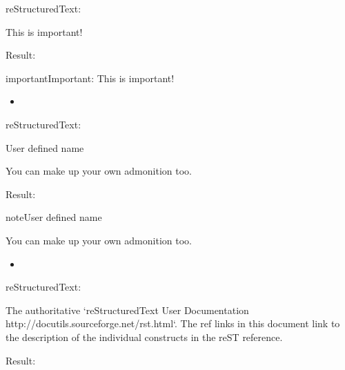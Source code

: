 \documentclass[letterpaper,12pt,english]{sphinxmanual}
\begin{document}
reStructuredText:

\begin{sphinxVerbatim}[commandchars=\\\{\}]
 

        This is important!
\end{sphinxVerbatim}

Result:

\begin{sphinxadmonition}{important}{Important:}
This is important!
\end{sphinxadmonition}
\begin{itemize}
\item {} 

\end{itemize}

reStructuredText:

\begin{sphinxVerbatim}[commandchars=\\\{\}]
  User defined name

   You can make up your own admonition too.
\end{sphinxVerbatim}

Result:

\begin{sphinxadmonition}{note}{User defined name}

You can make up your own admonition too.
\end{sphinxadmonition}
\begin{itemize}
\item {} 

\end{itemize}

reStructuredText:

\begin{sphinxVerbatim}[commandchars=\\\{\}]
 

   The authoritative {}`reStructuredText User Documentation
   \PYGZlt{}http://docutils.sourceforge.net/rst.html\PYGZgt{}{}`\PYGZus{}.  The \PYGZdq{}ref\PYGZdq{} links in this
   document link to the description of the individual constructs in the reST
   reference.
\end{sphinxVerbatim}

Result:


\end{document}
